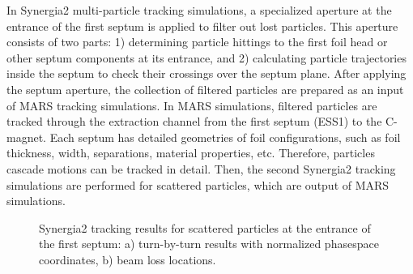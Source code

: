 \documentclass[aps,prstab,onecolumn,preprint]{revtex4-1}
\begin{document}
In Synergia2 multi-particle tracking simulations, a specialized aperture at the entrance of the first septum is applied to filter out lost particles. This aperture consists of two parts: 1) determining particle hittings to the first foil head or other septum components at its entrance, and 2) calculating particle trajectories inside the septum to check their crossings over the septum plane. After applying the septum aperture, the collection of filtered particles are prepared as an input of MARS tracking simulations. In MARS simulations, filtered particles are tracked through the extraction channel from the first septum (ESS1) to the C-magnet. Each septum has detailed geometries of foil configurations, such as foil thickness, width, separations, material properties, etc. Therefore, particles cascade motions can be tracked in detail. Then, the second Synergia2 tracking simulations are performed for scattered particles, which are output of MARS simulations.

\begin{figure}[!tbp]
  \caption{\label{fig:beamloss2}Synergia2 tracking results for scattered particles at the entrance of the first septum: a) turn-by-turn results with normalized phasespace coordinates, b) beam loss locations.}
\end{figure}
\end{document}
